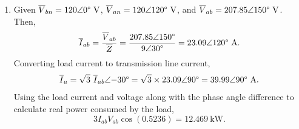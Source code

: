 \documentclass{article}
\begin{document}
\begin{enumerate}[label=\thesubsection]
\begin{enumerate}[label=\alph*)]
\[						\overline{I}_{a} = 20\angle{25.84\degree} + 30\angle{-36.87\degree} = 43.01\angle{-12.46\degree} \ \mathrm{A}. 
				\] 
				Then, the other two phases can be derived by simply shifting their phase angles \(120\degree\) backwards, \begin{align*}
					&\overline{I}_a = 43.01 \angle{-12.46\degree} \ \mathrm{A} \\
					&\overline{I}_b = 43.01 \angle{-132.46\degree} \ \mathrm{A} \\
					&\overline{I}_c = 43.01 \angle{107.54\degree} \ \mathrm{A}. 
				\end{align*} 
				\item Assuming a reference voltage phase angle of \(\theta = 0\degree\) for \(V_{an}\), we may derive the power factor as \[
					P.F. = \cos{(\theta_{VI})} = \cos{(0.2175)} = 0.9764 \ \mathrm{(lagging)}.
		  \]
			\item Using the phase voltage \(V_{ph} = \frac{400}{\sqrt{3}} = 230.94 \ \mathrm{V}\), we may find real power as \[
					P = [3 \times 230.94 \times 43.01]\cos{(0.2175)} = 29.096 \ \mathrm{kW}.
			\]
	\end{enumerate}
	\setcounter{subsection}{11}
\item Given \(\overline{V}_{bn} = 120\angle{0\degree} \ \mathrm{V}\), \(\overline{V}_{an} = 120 \angle{120\degree} \ \mathrm{V}\), and \(\overline{V}_{ab} = 207.85\angle{150\degree} \ \mathrm{V}\). Then, \[
		\overline{I}_{ab} = \frac{\overline{V}_{ab}}{\overline{Z}} = \frac{207.85 \angle{150\degree}}{9\angle{30\degree}} = 23.09\angle{120\degree} \ \mathrm{A}. 
\]
  Converting load current to transmission line current, \[
		\overline{I}_{a} = \sqrt{3} \ \overline{I}_{ab} \angle{-30\degree} = \sqrt{3} \times 23.09\angle{90\degree} = 39.99 \angle{90\degree} \ \mathrm{A}.  
  \]
	Using the load current and voltage along with the phase angle difference to calculate real power consumed by the load, \[
		3I_{ab}V_{ab}\cos{(0.5236)} = 12.469 \ \mathrm{kW}.
	\]
\end{enumerate}
\end{document}
